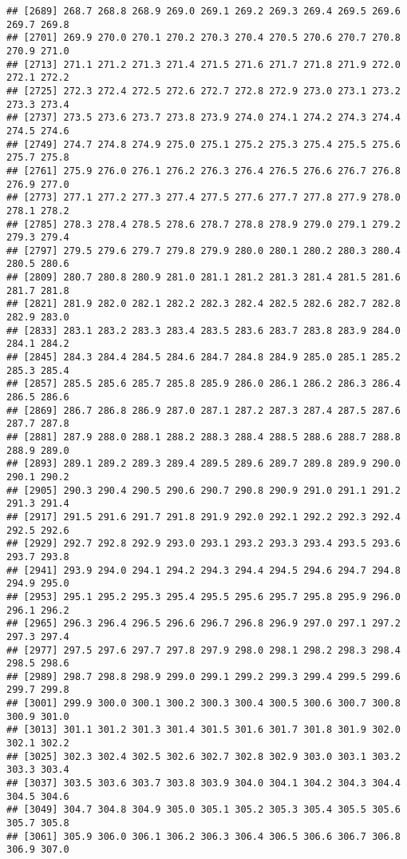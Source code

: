 \documentclass[
]{article}
\begin{document}
\begin{verbatim}
## [2689] 268.7 268.8 268.9 269.0 269.1 269.2 269.3 269.4 269.5 269.6 269.7 269.8
## [2701] 269.9 270.0 270.1 270.2 270.3 270.4 270.5 270.6 270.7 270.8 270.9 271.0
## [2713] 271.1 271.2 271.3 271.4 271.5 271.6 271.7 271.8 271.9 272.0 272.1 272.2
## [2725] 272.3 272.4 272.5 272.6 272.7 272.8 272.9 273.0 273.1 273.2 273.3 273.4
## [2737] 273.5 273.6 273.7 273.8 273.9 274.0 274.1 274.2 274.3 274.4 274.5 274.6
## [2749] 274.7 274.8 274.9 275.0 275.1 275.2 275.3 275.4 275.5 275.6 275.7 275.8
## [2761] 275.9 276.0 276.1 276.2 276.3 276.4 276.5 276.6 276.7 276.8 276.9 277.0
## [2773] 277.1 277.2 277.3 277.4 277.5 277.6 277.7 277.8 277.9 278.0 278.1 278.2
## [2785] 278.3 278.4 278.5 278.6 278.7 278.8 278.9 279.0 279.1 279.2 279.3 279.4
## [2797] 279.5 279.6 279.7 279.8 279.9 280.0 280.1 280.2 280.3 280.4 280.5 280.6
## [2809] 280.7 280.8 280.9 281.0 281.1 281.2 281.3 281.4 281.5 281.6 281.7 281.8
## [2821] 281.9 282.0 282.1 282.2 282.3 282.4 282.5 282.6 282.7 282.8 282.9 283.0
## [2833] 283.1 283.2 283.3 283.4 283.5 283.6 283.7 283.8 283.9 284.0 284.1 284.2
## [2845] 284.3 284.4 284.5 284.6 284.7 284.8 284.9 285.0 285.1 285.2 285.3 285.4
## [2857] 285.5 285.6 285.7 285.8 285.9 286.0 286.1 286.2 286.3 286.4 286.5 286.6
## [2869] 286.7 286.8 286.9 287.0 287.1 287.2 287.3 287.4 287.5 287.6 287.7 287.8
## [2881] 287.9 288.0 288.1 288.2 288.3 288.4 288.5 288.6 288.7 288.8 288.9 289.0
## [2893] 289.1 289.2 289.3 289.4 289.5 289.6 289.7 289.8 289.9 290.0 290.1 290.2
## [2905] 290.3 290.4 290.5 290.6 290.7 290.8 290.9 291.0 291.1 291.2 291.3 291.4
## [2917] 291.5 291.6 291.7 291.8 291.9 292.0 292.1 292.2 292.3 292.4 292.5 292.6
## [2929] 292.7 292.8 292.9 293.0 293.1 293.2 293.3 293.4 293.5 293.6 293.7 293.8
## [2941] 293.9 294.0 294.1 294.2 294.3 294.4 294.5 294.6 294.7 294.8 294.9 295.0
## [2953] 295.1 295.2 295.3 295.4 295.5 295.6 295.7 295.8 295.9 296.0 296.1 296.2
## [2965] 296.3 296.4 296.5 296.6 296.7 296.8 296.9 297.0 297.1 297.2 297.3 297.4
## [2977] 297.5 297.6 297.7 297.8 297.9 298.0 298.1 298.2 298.3 298.4 298.5 298.6
## [2989] 298.7 298.8 298.9 299.0 299.1 299.2 299.3 299.4 299.5 299.6 299.7 299.8
## [3001] 299.9 300.0 300.1 300.2 300.3 300.4 300.5 300.6 300.7 300.8 300.9 301.0
## [3013] 301.1 301.2 301.3 301.4 301.5 301.6 301.7 301.8 301.9 302.0 302.1 302.2
## [3025] 302.3 302.4 302.5 302.6 302.7 302.8 302.9 303.0 303.1 303.2 303.3 303.4
## [3037] 303.5 303.6 303.7 303.8 303.9 304.0 304.1 304.2 304.3 304.4 304.5 304.6
## [3049] 304.7 304.8 304.9 305.0 305.1 305.2 305.3 305.4 305.5 305.6 305.7 305.8
## [3061] 305.9 306.0 306.1 306.2 306.3 306.4 306.5 306.6 306.7 306.8 306.9 307.0

\end{verbatim}
\end{document}
